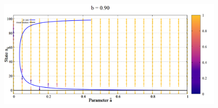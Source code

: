 \begin{figure}[h!]
 \centering
  \includegraphics[width=\linewidth]{images/appendix/vectors/5.png}
\end{figure}
